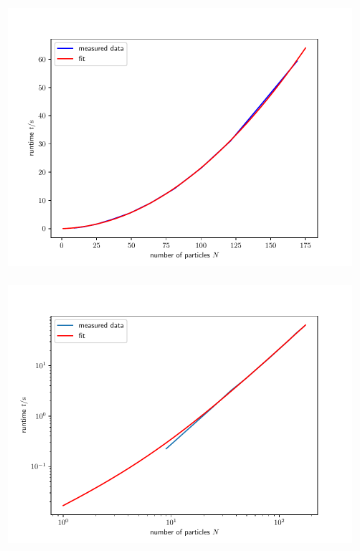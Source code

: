 \documentclass[a4paper,10pt,bibtotoc]{scrartcl}
\begin{document}
\begin{figure}
    \begin{subfigure}[t]{.5\textwidth}
        \centering
        \caption{}
        \includegraphics[width=1\linewidth]{Fit1.pdf}
        \label{fig:sfig1}
    \end{subfigure}\hfill %
    \begin{subfigure}[t]{.5\textwidth}
        \centering
        \caption{}
        \includegraphics[width=1\linewidth]{Fit2.pdf}
        \label{fig:sfig1}
    \end{subfigure}
    \begin{subfigure}[t]{.5\textwidth}
        \centering
        \caption{}

\end{subfigure}
\end{figure}
\end{document}
